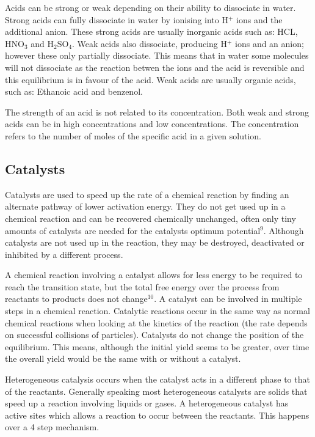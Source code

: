Acids can be strong or weak depending on their ability to dissociate in water. Strong acids can fully dissociate in water by ionising into H$^+$ ions and the additional anion. These strong acids are usually inorganic acids such as: HCL, HNO$_3$ and H$_2$SO$_4$. Weak acids also dissociate, producing H$^+$ ions and an anion; however these only partially dissociate. This means that in water some molecules will not dissociate as the reaction betwen the ions and the acid is reversible and this equilibrium is in favour of the acid. Weak acids are usually organic acids, such as: Ethanoic acid and benzenol. 

The strength of an acid is not related to its concentration. Both weak and strong acids can be in high concentrations and low concentrations. The concentration refers to the number of moles of the specific acid in a given solution.



	\subsection{Catalysts}

Catalysts are used to speed up the rate of a chemical reaction by finding an alternate pathway of lower activation energy. They do not get used up in a chemical reaction and can be recovered chemically unchanged, often only tiny amounts of catalysts are needed for the catalysts optimum potential$^9$. Although catalysts are not used up in the reaction, they may be destroyed, deactivated or inhibited by a different process. 

A chemical reaction involving a catalyst allows for less energy to be required to reach the transition state, but the total free energy over the process from reactants to products does not change$^{10}$. A catalyst can be involved in multiple steps in a chemical reaction. Catalytic reactions occur in the same way as normal chemical reactions when looking at the kinetics of the reaction (the rate depends on successful collisions of particles). Catalysts do not change the position of the equilibrium. This means, although the initial yield seems to be greater, over time the overall yield would be the same with or without a catalyst. 

Heterogeneous catalysis occurs when the catalyst acts in a different phase to that of the reactants. Generally speaking most heterogeneous catalysts are solids that speed up a reaction involving liquids or gases. A heterogeneous catalyst has active sites which allows a reaction to occur between the reactants. This happens over a 4 step mechanism.


